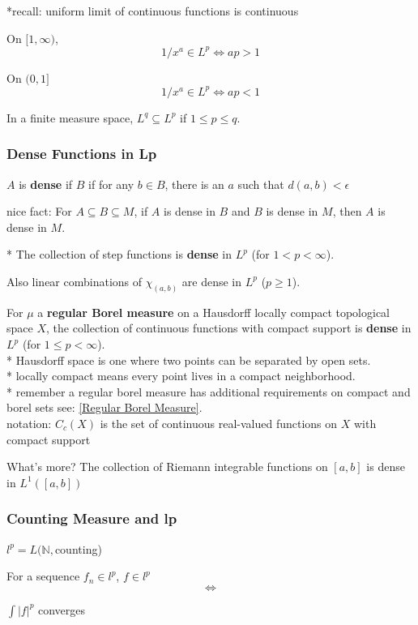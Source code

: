 \documentclass[a4paper, 12pt]{article}
\def\N{\ensuremath{\mathbb{N}}}
\newcommand{\bt}[1]{\textbf{#1}} %
\newcommand{\gray}[1]{{\leavevmode\color[gray]{0.5}{#1}}} %
\begin{document}
\begin{multicols}{2}
*recall: uniform limit of continuous functions is continuous

On $[1, \infty)$,
$$1/x^a \in L^p \iff ap > 1$$

On $(0, 1]$
$$1/x^a \in L^p \iff ap < 1$$

In a finite measure space, $L^q \subseteq L^p$ if $1 \leq p \leq q$.

\subsubsection{Dense Functions in Lp}

$A$ is \bt{dense} if $B$ if for any $b \in B$, there is an $a$ such that $d(a, b) < \epsilon$

nice fact: For $A \subseteq B \subseteq M$, if $A$ is dense in $B$ and $B$ is dense in $M$,
then $A$ is dense in $M$.

* The collection of step functions is \bt{dense} in $L^p$ (for $1 < p < \infty$).

Also linear combinations of $\chi_{(a, b)}$ are dense in $L^p$ ($p \geq 1$).

For $\mu$ a \bt{regular Borel measure} on a Hausdorff locally compact topological space $X$, 
the collection of continuous functions with compact support is \bt{dense} in $L^p$ 
(for $1 \leq p < \infty$).\\

* Hausdorff space is one where two points can be separated by open sets. \\
* locally compact means every point lives in a compact neighborhood.\\
* remember a regular borel measure has additional requirements on compact and borel sets 
see: \ref{Regular Borel Measure}. \\

notation: $C_c(X)$ is the set of continuous real-valued functions on $X$ with 
compact support


What's more? The collection of Riemann integrable functions on $[a, b]$ is
dense in $L^1([a, b])$


\subsubsection{Counting Measure and lp}
$l^p = L(\N,$counting)

For a sequence $f_n \in l^p$, $f \in l^p$\\
$$\iff$$ 
\centerline{$\int |f|^p$ converges}\\
\gray{meaning $\sum |f_n(\N)|^p$ converges.}



\end{multicols}
\end{document}
